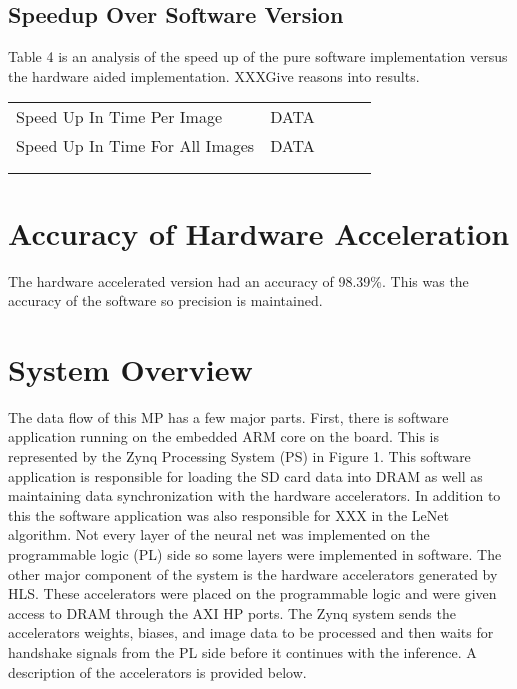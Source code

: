 \documentclass{document}  %
\begin{document}
\subsection{Speedup Over Software Version}
Table 4 is an analysis  of the speed up of the pure software implementation versus the hardware aided implementation. XXXGive reasons into results.

\begin{table}[H]
\begin{center}
\begin{tabular}{lllll}
\cline{1-2}
\multicolumn{1}{|l|}{Speed Up  In Time Per Image}     & \multicolumn{1}{l|}{DATA} &  &  &  \\ \cline{1-2}
\multicolumn{1}{|l|}{Speed Up In Time For All Images} & \multicolumn{1}{l|}{DATA} &  &  &  \\ \cline{1-2}
                                                      &                       &  &  &  \\
                                                      &                       &  &  & 
\end{tabular}
\end{center}
\end{table}

\section{Accuracy of Hardware Acceleration}
The hardware accelerated version had an accuracy of 98.39\%.  This was the accuracy of the software so precision is maintained. 


\section{System Overview}
The data flow of this MP has a few major parts. First, there is software application running on the embedded ARM core on the board. This is represented by the Zynq Processing System (PS) in Figure 1.  This software application is responsible for loading the SD card data into DRAM as well as maintaining data synchronization with the hardware accelerators. In addition to this the software application was also responsible for XXX in the LeNet algorithm. Not every layer of the neural net was implemented on the programmable logic (PL) side so some layers were implemented in software. The other major component of the system is the hardware accelerators generated by HLS. These accelerators were placed on the programmable logic and were given access to DRAM through the AXI HP ports. The Zynq system sends the accelerators weights, biases, and image data to be processed and then waits for handshake signals from the PL side before it continues with the inference. A description of the accelerators is provided below. 
\end{document}
